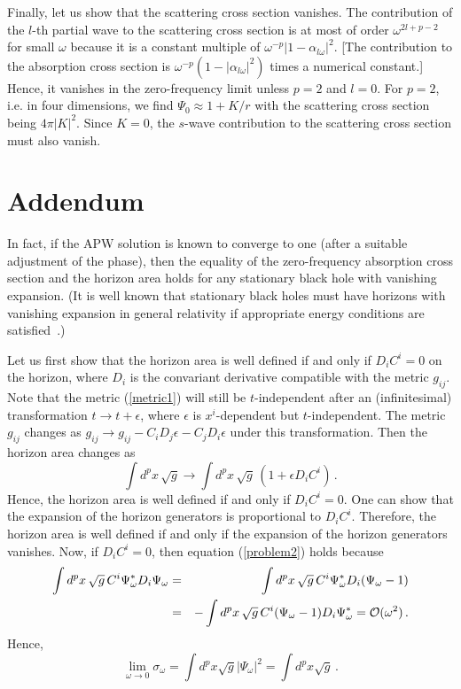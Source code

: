 \documentclass[a4paper,12pt]{article}
\begin{document}
Finally, let us show that the scattering cross section vanishes.  
The contribution of the $l$-th partial wave to the scattering cross
section is at most of order $\omega^{2l+p-2}$ for small $\omega$
because it is a constant multiple of
$\omega^{-p}|1-\alpha_{l\omega}|^2$. 
[The contribution to the absorption cross section is 
$\omega^{-p}(1-|\alpha_{l\omega}|^2)$ times a numerical constant.]
Hence, it vanishes in the zero-frequency limit unless $p=2$ and $l=0$.
For $p=2$, i.e. in four dimensions, we find
$\Psi_0 \approx 1 + K/r$
with the scattering cross section being $4\pi|K|^2$.  Since $K=0$, the 
$s$-wave contribution to the scattering cross section must also vanish.

\section*{Addendum}

In fact, if the APW solution is known to converge to one (after a suitable
adjustment of the phase), then the equality of the zero-frequency absorption
cross section and the horizon area holds for any stationary black hole with
vanishing expansion.
(It is well known that
stationary black holes must have horizons with vanishing 
expansion in general relativity if appropriate
energy conditions are satisfied~\cite{Hawking,Carter}.) 

Let us first show that the horizon area is well defined if and only if
$D_i C^i = 0$ on the horizon, where $D_i$ is the convariant derivative 
compatible with the metric $g_{ij}$.
Note that the metric (\ref{metric1}) will still be $t$-independent after an
(infinitesimal) transformation
$t \to t + \epsilon$,
where $\epsilon$ is $x^i$-dependent but $t$-independent.  The metric
$g_{ij}$ changes as
$g_{ij} \to g_{ij} - C_i D_j\epsilon - C_j D_i\epsilon$ under this 
transformation.
Then the horizon area changes as
\begin{equation}
\int d^p x\,\sqrt{g} \to \int d^p x\,\sqrt{g}\,(1 + \epsilon D_i C^i)\,.
\end{equation}
Hence, the horizon area is well defined if and only if $D_i C^i = 0$.  
One can show that 
the expansion of the horizon generators is
proportional to $D_i C^i$. Therefore, the horizon area is well defined
if and only if the expansion of the horizon generators 
vanishes.  
Now, if $D_i C^i = 0$, then equation (\ref{problem2}) holds
because 
\begin{eqnarray}
\int d^p x\,\sqrt{g}\, C^i \Psi_\omega^*D_i \Psi_\omega
& = & 
\int d^p x\,\sqrt{g}\,C^i \Psi_\omega^*D_i (\Psi_\omega - 1) \nonumber \\
& = & 
- \int d^p x\,\sqrt{g}\,C^i(\Psi_\omega - 1)D_i\Psi_\omega^*
=  {\cal O}(\omega^2)\,.
\end{eqnarray}
Hence,
\begin{equation}
\lim_{\omega \to 0} \sigma_\omega
= \int d^p x \sqrt{g}|\Psi_\omega|^2
= \int d^p x \sqrt{g}\,.
\end{equation}
\end{document}
